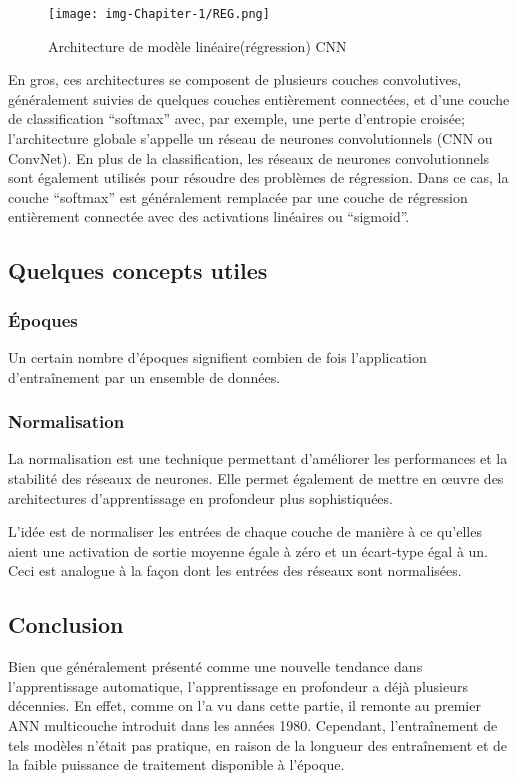\documentclass[12pt]{article}
\begin{document}
\begin{figure}[h]
	\centering
	\texttt{[image: img-Chapiter-1/REG.png]}
	\caption{Architecture de modèle linéaire(régression) CNN}
\end{figure}

En gros, ces architectures se composent de plusieurs couches convolutives, généralement suivies de quelques couches entièrement connectées, et d'une couche de classification “softmax” avec, par exemple, une perte d'entropie croisée; l'architecture globale s'appelle un réseau de neurones convolutionnels (CNN ou ConvNet). En plus de la classification, les réseaux de neurones convolutionnels sont également utilisés pour résoudre des problèmes de régression. Dans ce cas, la couche “softmax” est généralement remplacée par une couche de régression entièrement connectée avec des activations linéaires ou “sigmoid”.

\subsection{Quelques concepts utiles}
\subsubsection*{Époques}
Un certain nombre d'époques signifient combien de fois l'application d’entraînement par un ensemble de données.

\subsubsection*{Normalisation}
La normalisation est une technique permettant d'améliorer les performances et la stabilité des réseaux de neurones. Elle permet également de mettre en œuvre des architectures d'apprentissage en profondeur plus sophistiquées.

L'idée est de normaliser les entrées de chaque couche de manière à ce qu'elles aient une activation de sortie moyenne égale à zéro et un écart-type égal à un. Ceci est analogue à la façon dont les entrées des réseaux sont normalisées.

\subsection{Conclusion}
Bien que généralement présenté comme une nouvelle tendance dans l'apprentissage automatique, l'apprentissage en profondeur a déjà plusieurs décennies. En effet, comme on l'a vu dans cette partie, il remonte au premier ANN multicouche introduit dans les années 1980. Cependant, l’entraînement de tels modèles n’était pas pratique, en raison de la longueur des entraînement et de la faible puissance de traitement disponible à l’époque.
\end{document}
